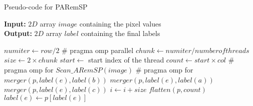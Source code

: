 \begin{algorithm}[H]
\small
{
	\caption{Pseudo-code for PARemSP}
	\label{alg:PARemSP}
	\textbf{Input:} $2D$ array $image$ containing the pixel values \\
	\textbf{Output:} $2D$ array $label$ containing the final labels
	\begin{algorithmic}[1]
		\State $num iter \gets row/2 $ 
		\State \# pragma omp parallel
			\State $chunk \gets numiter/number of threads $ 
			\State $size \gets 2 \times chunk$
			\State $start \gets $ start index of the thread
			\State $count \gets start \times col$
			\State \# pragma omp for
				\State $Scan\_ARemSP(image)$
			\State \# pragma omp for
					  			\State $merger(p,label(e),label(b))$
					  		\Else
									\State $merger(p,label(e),label(a))$
								\EndIf
									\State $merger(p,label(e),label(c))$
								\EndIf
							\EndIf
						\EndIf
					\EndFor
					\State $i \gets i + size$
				\EndFor		
		\State $flatten(p,count)$ 
				\State $label(e) \gets p[label(e)]$
			\EndFor
		\EndFor		
	\EndFunction
	\end{algorithmic}	
}
\end{algorithm}


